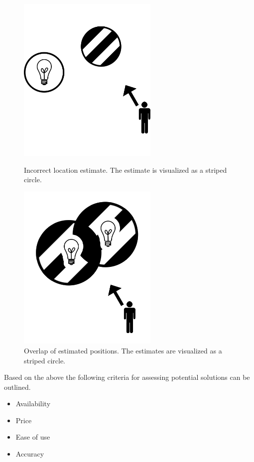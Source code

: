 \begin{figure}[!htb]
    \centering
    \begin{minipage}[t]{0.45\textwidth}
        \centering
        \includegraphics[width=0.6\textwidth]{images/incorrect-positioning-estimate.png}
        \caption{Incorrect location estimate. The estimate is visualized as a striped circle.}
        \label{fig:indoor-positioning:incorrect}
    \end{minipage}\qquad
    \begin{minipage}[t]{0.45\textwidth}
        \centering
        \includegraphics[width=0.6\textwidth]{images/positioning-overlap.png}
        \caption{Overlap of estimated positions. The estimates are visualized as a striped circle.}
        \label{fig:indoor-positioning:overlap}
    \end{minipage}
\end{figure}

Based on the above the following criteria for assessing potential solutions can be outlined.

\begin{itemize}
    \item Availability
    \item Price
    \item Ease of use
    \item Accuracy
\end{itemize}